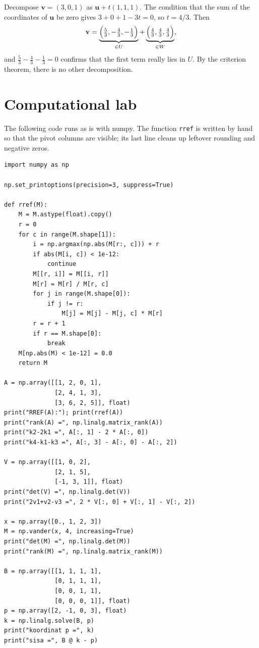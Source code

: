 Decompose $\mathbf{v}=(3,0,1)$ as $\mathbf{u}+t(1,1,1)$. The condition that the sum of the
coordinates of $\mathbf{u}$ be zero gives $3+0+1-3t=0$, so $t=4/3$. Then
\[
  \mathbf{v}=\underbrace{\Bigl(\tfrac53,-\tfrac43,-\tfrac13\Bigr)}_{\in U}
  +\underbrace{\Bigl(\tfrac43,\tfrac43,\tfrac43\Bigr)}_{\in W},
\]
and $\tfrac53-\tfrac43-\tfrac13=0$ confirms that the first term really lies in $U$. By the
criterion theorem, there is no other decomposition.


\section{Computational lab}

The following code runs as is with numpy. The function \texttt{rref} is written by hand so that the
pivot columns are visible; its last line cleans up leftover rounding and negative zeros.

\begin{lab}
\begin{verbatim}
import numpy as np

np.set_printoptions(precision=3, suppress=True)

def rref(M):
    M = M.astype(float).copy()
    r = 0
    for c in range(M.shape[1]):
        i = np.argmax(np.abs(M[r:, c])) + r
        if abs(M[i, c]) < 1e-12:
            continue
        M[[r, i]] = M[[i, r]]
        M[r] = M[r] / M[r, c]
        for j in range(M.shape[0]):
            if j != r:
                M[j] = M[j] - M[j, c] * M[r]
        r = r + 1
        if r == M.shape[0]:
            break
    M[np.abs(M) < 1e-12] = 0.0
    return M

A = np.array([[1, 2, 0, 1],
              [2, 4, 1, 3],
              [3, 6, 2, 5]], float)
print("RREF(A):"); print(rref(A))
print("rank(A) =", np.linalg.matrix_rank(A))
print("k2-2k1 =", A[:, 1] - 2 * A[:, 0])
print("k4-k1-k3 =", A[:, 3] - A[:, 0] - A[:, 2])

V = np.array([[1, 0, 2],
              [2, 1, 5],
              [-1, 3, 1]], float)
print("det(V) =", np.linalg.det(V))
print("2v1+v2-v3 =", 2 * V[:, 0] + V[:, 1] - V[:, 2])

x = np.array([0., 1, 2, 3])
M = np.vander(x, 4, increasing=True)
print("det(M) =", np.linalg.det(M))
print("rank(M) =", np.linalg.matrix_rank(M))

B = np.array([[1, 1, 1, 1],
              [0, 1, 1, 1],
              [0, 0, 1, 1],
              [0, 0, 0, 1]], float)
p = np.array([2, -1, 0, 3], float)
k = np.linalg.solve(B, p)
print("koordinat p =", k)
print("sisa =", B @ k - p)
\end{verbatim}
\end{lab}

